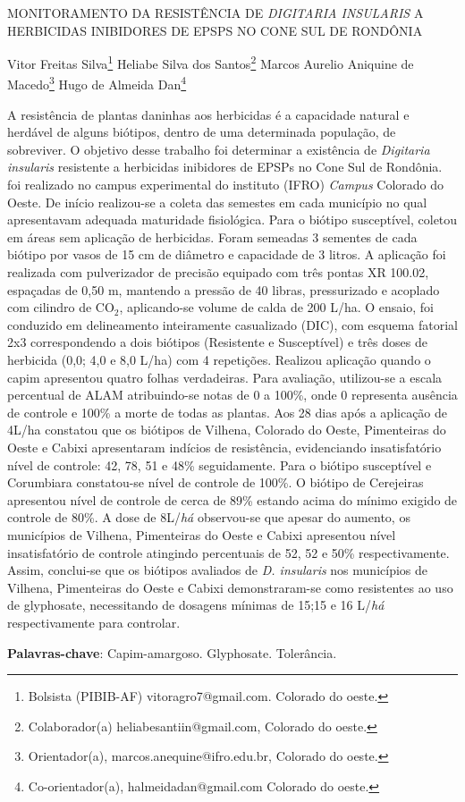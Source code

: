 \documentclass[article,12pt,onesidea,4paper,english,brazil]{abntex2}
\begin{document}
	
	
	\frenchspacing 
	
	\begin{center}
		\LARGE MONITORAMENTO DA RESISTÊNCIA DE \textit{DIGITARIA INSULARIS} A
		HERBICIDAS INIBIDORES DE EPSPS NO CONE SUL DE RONDÔNIA
		
		\normalsize
		Vitor Freitas Silva\footnote{Bolsista (PIBIB-AF) vitoragro7@gmail.com. Colorado do oeste.} 
		Heliabe Silva dos Santos\footnote{Colaborador(a) heliabesantiin@gmail.com, Colorado do oeste.} 
		Marcos Aurelio Aniquine de Macedo\footnote{Orientador(a), marcos.anequine@ifro.edu.br, Colorado do oeste.} 
		Hugo de Almeida Dan\footnote{Co-orientador(a), halmeidadan@gmail.com Colorado do oeste.} 
	\end{center}
	
	\noindent A resistência de plantas daninhas aos herbicidas é a capacidade natural e herdável
	de alguns biótipos, dentro de uma determinada população, de sobreviver. O objetivo
	desse trabalho foi determinar a existência de \textit{Digitaria insularis} resistente a
	herbicidas inibidores de EPSPs no Cone Sul de Rondônia. foi realizado no campus
	experimental do instituto (IFRO) \textit{Campus} Colorado do Oeste. De início realizou-se a
	coleta das semestes em cada município no qual apresentavam adequada
	maturidade fisiológica. Para o biótipo susceptível, coletou em áreas sem aplicação
	de herbicidas. Foram semeadas 3 sementes de cada biótipo por vasos de 15 cm de
	diâmetro e capacidade de 3 litros. A aplicação foi realizada com pulverizador de
	precisão equipado com três pontas XR 100.02, espaçadas de 0,50 m, mantendo a
	pressão de 40 libras, pressurizado e acoplado com cilindro de CO$_2$, aplicando-se
	volume de calda de 200 L/ha. O ensaio, foi conduzido em delineamento inteiramente
	casualizado (DIC), com esquema fatorial 2x3 correspondendo a dois biótipos
	(Resistente e Susceptível) e três doses de herbicida (0,0; 4,0 e 8,0 L/ha) com 4
	repetições. Realizou aplicação quando o capim apresentou quatro folhas
	verdadeiras. Para avaliação, utilizou-se a escala percentual de ALAM atribuindo-se
	notas de 0 a 100\%, onde 0 representa ausência de controle e 100\% a morte de
	todas as plantas. Aos 28 dias após a aplicação de 4L/ha constatou que os biótipos
	de Vilhena, Colorado do Oeste, Pimenteiras do Oeste e Cabixi apresentaram
	indícios de resistência, evidenciando insatisfatório nível de controle: 42, 78, 51 e
	48\% seguidamente. Para o biótipo susceptível e Corumbiara constatou-se nível de
	controle de 100\%. O biótipo de Cerejeiras apresentou nível de controle de cerca de
	89\% estando acima do mínimo exigido de controle de 80\%. A dose de 8L/\textit{há}
	observou-se que apesar do aumento, os municípios de Vilhena, Pimenteiras do
	Oeste e Cabixi apresentou nível insatisfatório de controle atingindo percentuais de
	52, 52 e 50\% respectivamente. Assim, conclui-se que os biótipos avaliados de \textit{D.
	insularis} nos municípios de Vilhena, Pimenteiras do Oeste e Cabixi demonstraram-se
	como resistentes ao uso de glyphosate, necessitando de dosagens mínimas de
	15;15 e 16 L/\textit{há} respectivamente para controlar.
	
	\vspace{\onelineskip}
	
	\noindent
	\textbf{Palavras-chave}: Capim-amargoso. Glyphosate. Tolerância.	
\end{document}

